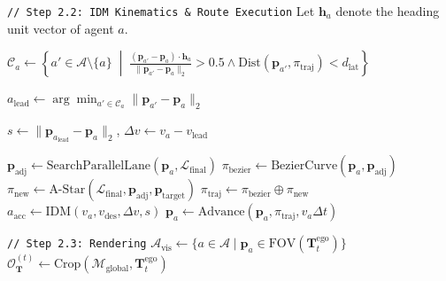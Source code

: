 \begin{algorithm}[htb]
\begin{algorithmic}[1]
\State \texttt{// Step 2.2: IDM Kinematics \& Route Execution}
    \State Let $\mathbf{h}_a$ denote the heading unit vector of agent $a$.
    
    \State $ \mathcal{C}_a \gets \left\{ a' \in \mathcal{A} \setminus \{a\} \;\middle|\; \frac{(\mathbf{p}_{a'} - \mathbf{p}_a) \cdot \mathbf{h}_a}{\|\mathbf{p}_{a'} - \mathbf{p}_a\|_2} > 0.5 \land \text{Dist}(\mathbf{p}_{a'}, \pi_{\text{traj}}) < d_{\text{lat}} \right\}$ \label{algline:leading_vehicles}
        
    \State $a_{\text{lead}} \gets \arg\min_{a' \in \mathcal{C}_a} \|\mathbf{p}_{a'} - \mathbf{p}_a\|_2$ 
    
    
    \State $s \gets \|\mathbf{p}_{a_{\text{lead}}} - \mathbf{p}_a\|_2$, $\Delta v \gets v_a - v_{\text{lead}}$ 
    
     \label{algline:lanechange_logic}
        \State $\mathbf{p}_{\text{adj}} \gets \text{SearchParallelLane}(\mathbf{p}_a, \mathcal{L}_{\text{final}})$
            \State $\pi_{\text{bezier}} \gets \text{BezierCurve}(\mathbf{p}_a, \mathbf{p}_{\text{adj}})$ 
            \State $\pi_{\text{new}} \gets \text{A-Star}(\mathcal{L}_{\text{final}}, \mathbf{p}_{\text{adj}}, \mathbf{p}_{\text{target}})$ 
            \State $\pi_{\text{traj}} \gets \pi_{\text{bezier}} \oplus \pi_{\text{new}}$ 
            \State $a_{\text{acc}} \gets \text{IDM}(v_a, v_{\text{des}}, \Delta v, s)$ \hfill {}
            \State $\mathbf{p}_a \gets \text{Advance}(\mathbf{p}_a, \pi_{\text{traj}}, v_a \Delta t)$ 
        \EndIf
    \EndIf
    \EndFor
            
\State \texttt{// Step 2.3: Rendering}
    \State $\mathcal{A}_{\text{vis}} \gets \{a \in \mathcal{A} \mid \mathbf{p}_a \in \text{FOV}(\mathbf{T}_t^{\text{ego}})\}$ \hfill {}
    \State $\mathcal{O}_{\mathbf{T}}^{(t)} \gets \text{Crop}(\mathcal{M}_{\text{global}}, \mathbf{T}_t^{\text{ego}})$ \hfill {}


\end{algorithmic}
\end{algorithm}
